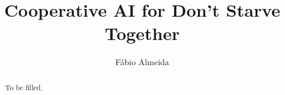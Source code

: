 \documentclass[a4paper]{llncs}
\begin{document}
\title{Cooperative AI for Don't Starve Together}
\author{Fábio Almeida}

\maketitle

\begin{abstract}
To be filled.
\end{abstract}




\end{document}
